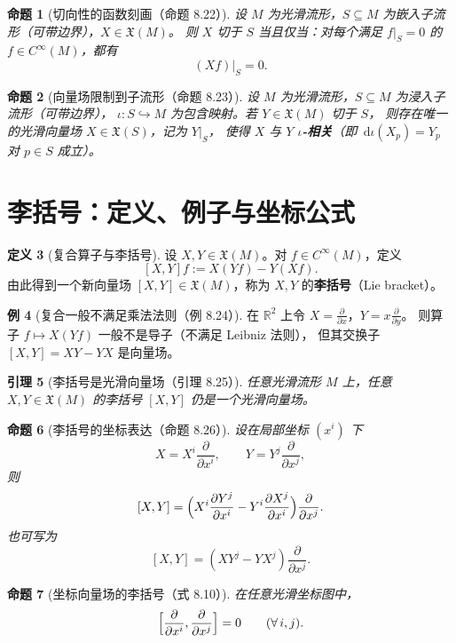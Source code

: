 \documentclass[11pt,a4paper]{article}
\newcommand{\R}{\mathbb{R}}
\newcommand{\X}{\mathfrak{X}} %
\newcommand{\dd}{\,\mathrm{d}}
\theoremstyle{definition}
\newtheorem{definition}{定义}[section]
\newtheorem{example}[definition]{例}
\theoremstyle{plain}
\newtheorem{proposition}[definition]{命题}
\newtheorem{lemma}[definition]{引理}
\begin{document}
\begin{proposition}[切向性的函数刻画（命题 8.22）]
设 $M$ 为光滑流形，$S\subseteq M$ 为嵌入子流形（可带边界），$X\in\X(M)$。
则 $X$ 切于 $S$ 当且仅当：对每个满足 $f|_S=0$ 的 $f\in C^\infty(M)$，都有
\[
(Xf)|_S=0.
\]
\end{proposition}

\begin{proposition}[向量场限制到子流形（命题 8.23）]
设 $M$ 为光滑流形，$S\subseteq M$ 为浸入子流形（可带边界），
$\iota:S\hookrightarrow M$ 为包含映射。若 $Y\in\X(M)$ 切于 $S$，
则存在唯一的光滑向量场 $X\in\X(S)$，记为 $Y|_S$，
使得 $X$ 与 $Y$ \textbf{$\iota$-相关}（即 $\dd \iota(X_p)=Y_p$ 对 $p\in S$ 成立）。
\end{proposition}

\section{李括号：定义、例子与坐标公式}

\begin{definition}[复合算子与李括号]
设 $X,Y\in\X(M)$。对 $f\in C^\infty(M)$，定义
\[
[X,Y]f := X(Yf)-Y(Xf).
\]
由此得到一个新向量场 $[X,Y]\in\X(M)$，称为 $X,Y$ 的\textbf{李括号}（Lie bracket）。
\end{definition}

\begin{example}[复合一般不满足乘法法则（例 8.24）]
在 $\R^2$ 上令 $X=\frac{\partial}{\partial x}$，$Y=x\frac{\partial}{\partial y}$。
则算子 $f\mapsto X(Yf)$ 一般不是导子（不满足 Leibniz 法则），
但其交换子 $[X,Y]=XY-YX$ 是向量场。
\end{example}

\begin{lemma}[李括号是光滑向量场（引理 8.25）]
任意光滑流形 $M$ 上，任意 $X,Y\in\X(M)$ 的李括号 $[X,Y]$ 仍是一个光滑向量场。
\end{lemma}

\begin{proposition}[李括号的坐标表达（命题 8.26）]
设在局部坐标 $(x^i)$ 下
\[
X=X^i\frac{\partial}{\partial x^i},\qquad
Y=Y^j\frac{\partial}{\partial x^j},
\]
则
\[
[X,Y]=\Bigl(X^i\frac{\partial Y^j}{\partial x^i}-Y^i\frac{\partial X^j}{\partial x^i}\Bigr)\frac{\partial}{\partial x^j}.
\]
也可写为
\[
[X,Y]=(XY^j-YX^j)\frac{\partial}{\partial x^j}.
\]
\end{proposition}

\begin{proposition}[坐标向量场的李括号（式 8.10）]
在任意光滑坐标图中，
\[
\Bigl[\frac{\partial}{\partial x^i},\frac{\partial}{\partial x^j}\Bigr]=0\qquad(\forall\, i,j).
\]
\end{proposition}
\end{document}
